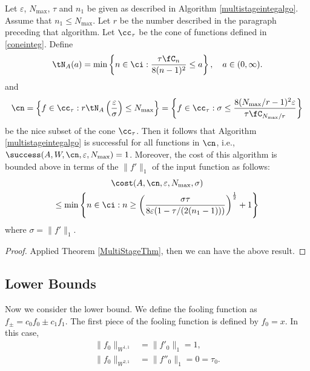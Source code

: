  \begin{theorem}

Let  $\varepsilon$, $N_{\max}$, $\tau$ and $n_1$ be given as described in Algorithm \ref{multistageintegalgo}.
Assume that $n_1 \le N_{\max}$. Let $r$ be the number described in the paragraph preceding that algorithm.
Let $\cc_\tau$ be the cone of functions defined in \eqref{coneinteg}.
Define
\[
\tN_A(a) = \min\left\{ n \in \ci : \frac{\tau \fC_n }{8(n-1)^2} \le a \right\}, \quad a \in (0,\infty).
\]
and
$$
\cn = \left \{ f \in \cc_\tau :r\tN_{A}\left(\frac{\varepsilon}{\sigma} \right) \le N_{\max} \right\}
= \left \{ f \in \cc_\tau : \sigma \le \frac{8(N_{\max}/r-1)^2 \varepsilon }{\tau \fC_{N_{\max}/r}  } \right\}
$$
be the nice subset of the cone $\cc_\tau$.  Then it follows that Algorithm \ref{multistageintegalgo} is successful for all functions in $\cn$,  i.e.,  $\success(A,W,\cn,\varepsilon,N_{\max}) = 1$.  Moreover, the cost of this algorithm is bounded above in terms of the $\|f'\|_{1}$ of the input function as follows:
\begin{multline}
\cost(A,\cn,\varepsilon,N_{\max},\sigma) \\
\le  \min\left\{ n \in \ci : n \ge \left(\frac{\sigma\tau}{8\varepsilon(1 - \tau/(2(n_{1}-1)))}\right)^{\frac{1}{2}} +1\right\}
\end{multline} where $\sigma=\|f'\|_{1}.$
 \end{theorem}

\begin{proof}
Applied Theorem \ref{MultiStageThm}, then we can have the above result.
\end{proof}




\subsection{Lower Bounds}
Now we consider the lower bound. We define the fooling function as $f_{\pm}=c_0f_0\pm c_1f_1$. The first piece of the fooling function is defined by $f_0=x$. In this case,
\begin{align*}
    \|f_0\|_{W^{1,1}}&=\|f'_0\|_1=1,\\
    \|f_0\|_{W^{2,1}}&=\|f''_0\|_1=0=\tau_0.
\end{align*}

